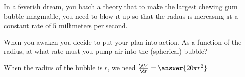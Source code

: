 \documentclass{ximera}
\author{Steven Gubkin}
\begin{document}
\begin{exercise}



     In a feverish dream, you hatch a theory that to make the largest chewing gum bubble imaginable, you need to blow it up so that the radius is increasing at a constant rate of $5$ millimeters per second.
	 
	When you awaken you decide to put your plan into action.  As a function of the radius, at what rate must you pump air into the (spherical) bubble?

\begin{prompt}
	When the radius of the bubble is $r$, we need $\frac{\d V}{\d t} = \answer{20\pi r^2}$
\end{prompt}

\end{exercise}
\end{document}
